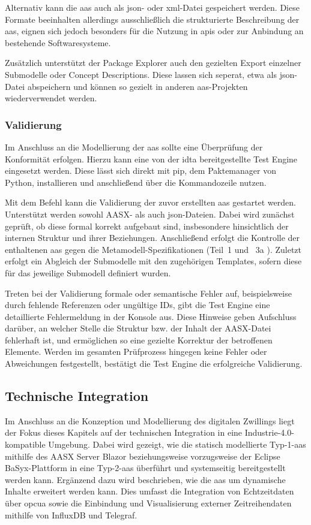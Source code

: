 Alternativ kann die \acs{aas} auch als \ac{json}- oder \ac{xml}-Datei gespeichert werden.
Diese Formate beeinhalten allerdings ausschließlich die strukturierte Beschreibung der \acs{aas}, eignen sich jedoch besonders für die Nutzung in \acsp{api} oder zur Anbindung an bestehende Softwaresysteme.

Zusätzlich unterstützt der Package Explorer auch den gezielten Export einzelner Submodelle oder Concept Descriptions.
Diese lassen sich seperat, etwa als \acs{json}-Datei abspeichern und können so gezielt in anderen \acs{aas}-Projekten wiederverwendet werden.

\subsubsection{Validierung}
Im Anschluss an die Modellierung der \acs{aas} sollte eine Überprüfung der Konformität erfolgen.
Hierzu kann eine von der \acs{idta} bereitgestellte Test Engine \cite{TestEngine} eingesetzt werden. 
Diese lässt sich direkt mit pip, dem Paktemanager von Python, installieren und anschließend über die Kommandozeile nutzen.

Mit dem Befehl 
kann die Validierung der zuvor erstellten \acs{aas} gestartet werden.
Unterstützt werden sowohl AASX- als auch \acs{json}-Dateien.
Dabei wird zunächst geprüft, ob diese formal korrekt aufgebaut sind, insbesondere hinsichtlich der internen Struktur und ihrer Beziehungen.
Anschließend erfolgt die Kontrolle der enthaltenen \acs{aas} gegen die Metamodell-Spezifikationen (Teil~1 \cite{SpezifikationPart1} und%
\pagebreak 
~3a \cite{SpezifikationPart3a}).
Zuletzt erfolgt ein Abgleich der Submodelle mit den zugehörigen Templates, sofern diese für das jeweilige Submodell definiert wurden.

Treten bei der Validierung formale oder semantische Fehler auf, beispielsweise durch fehlende Referenzen oder ungültige IDs, gibt die Test Engine eine detaillierte Fehlermeldung in der Konsole aus. 
Diese Hinweise geben Aufschluss darüber, an welcher Stelle die Struktur bzw. der Inhalt der AASX-Datei fehlerhaft ist, und ermöglichen so eine gezielte Korrektur der betroffenen Elemente. 
Werden im gesamten Prüfprozess hingegen keine Fehler oder Abweichungen festgestellt, bestätigt die Test Engine die erfolgreiche Validierung.

\subsection{Technische Integration}
Im Anschluss an die Konzeption und Modellierung des digitalen Zwillings liegt der Fokus dieses Kapitels auf der technischen Integration in eine Industrie-4.0-kompatible Umgebung.
Dabei wird gezeigt, wie die statisch modellierte Typ-1-\acs{aas} mithilfe des AASX Server Blazor beziehungsweise vorzugsweise der Eclipse BaSyx-Plattform in eine Typ-2-\acs{aas} überführt und systemseitig bereitgestellt werden kann.
Ergänzend dazu wird beschrieben, wie die \acs{aas} um dynamische Inhalte erweitert werden kann.
Dies umfasst die Integration von Echtzeitdaten über \acs{opcua} sowie die Einbindung und Visualisierung externer Zeitreihendaten mithilfe von InfluxDB und Telegraf.

